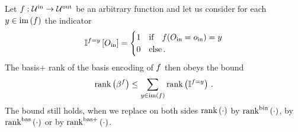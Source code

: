 \begin{theorem}
    Let $f : \mathcal{U}^{\mathrm{in}} \rightarrow \mathcal{U}^{\mathrm{out}}$ be an arbitrary function and let us consider for each $y\in\mathrm{im}\left(f\right)$ the indicator
    \begin{align*}
        \mathbb{I}^{f=y}\left[O_{\mathrm{in}}\right] =
        \begin{cases}
            1 & \text{if} \quad f(O_{\mathrm{in}}=o_{\mathrm{in}})=y \\
            0 & \text{else} \, .
        \end{cases}
    \end{align*}
    The basis+ rank of the basis encoding of $f$ then obeys the bound
    \begin{align*}
        \mathrm{rank}\left(\beta^{f}\right) \leq \sum_{y\in\mathrm{im}\left(f\right)} \mathrm{rank}\left(\mathbb{I}^{f=y} \right) \, .
    \end{align*}
    The bound still holds, when we replace on both sides $\mathrm{rank}\left(\cdot\right)$ by $\mathrm{rank}^{\mathrm{bin}}\left(\cdot\right)$, by $\mathrm{rank}^{\mathrm{bas}}\left(\cdot\right)$ or by $\mathrm{rank}^{\mathrm{bas+}}\left(\cdot\right)$.
\end{theorem}
